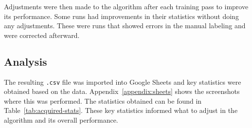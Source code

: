 \documentclass{report}
\begin{document}
Adjustments were then made to the algorithm after each training pass to improve
its performance. Some runs had improvements in their statistics without doing
any adjustments. These were runs that showed errors in the manual labeling and
were corrected afterward.

\subsection{Analysis}
The resulting \texttt{.csv} file was imported into Google Sheets and key
statistics were obtained based on the data. Appendix~\ref{appendix:sheets} shows
the screenshots where this was performed. The statistics obtained can be found
in Table~\ref{tab:acquired-stats}. These key statistics informed what to adjust
in the algorithm and its overall performance.
\end{document}
